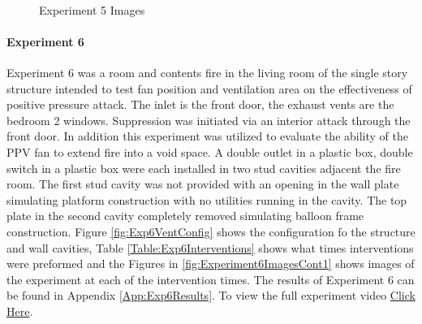 \documentclass{article}
\begin{document}
\begin{figure}[H]
	\ContinuedFloat 
	\centering 
	 \ 
	\caption{Experiment 5 Images}
	\label{fig:Experiment5ImagesCont3} 
\end{figure}

\clearpage

\paragraph{Experiment 6}\mbox{}

Experiment 6 was a room and contents fire in the living room of the single story structure intended to test fan position and ventilation area on the effectiveness of positive pressure attack. The inlet is the front door, the exhaust vents are the bedroom 2 windows. Suppression was initiated via an interior attack through the front door. In addition this experiment was utilized to evaluate the ability of the PPV fan to extend fire into a void space. A double outlet in a plastic box, double switch in a plastic box were each installed in two stud cavities adjacent the fire room. The first stud cavity was not provided with an opening in the wall plate simulating platform construction with no utilities running in the cavity. The top plate in the second cavity completely removed simulating balloon frame construction. Figure \ref{fig:Exp6VentConfig} shows the configuration fo the structure and wall cavities, Table \ref{Table:Exp6Interventions} shows what times interventions were preformed and the Figures in \ref{fig:Experiment6ImagesCont1} shows images of the experiment at each of the intervention times. The results of Experiment 6 can be found in Appendix \ref{App:Exp6Results}. To view the full experiment video \href{https://youtu.be/IDuoI21e-WI}{Click Here}.
\end{document}
